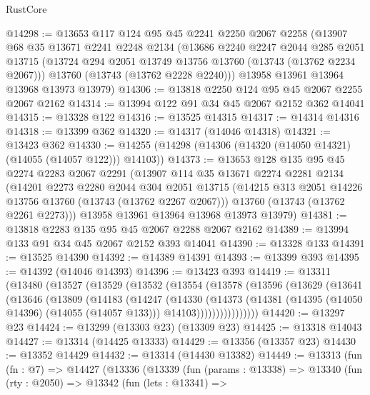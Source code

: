 \begin{lexlean}{RustCore}
\begin{coremodule}
@14298 := @13653
    @117
    @124
    @95
    @45
    @2241
    @2250
    @2067
    @2258
    (@13907
      @68
      @35
      @13671
      @2241
      @2248
      @2134
      (@13686
        @2240
        @2247
        @2044
        @285
        @2051
        @13715
        (@13724 @294 @2051 @13749 @13756 @13760 (@13743 (@13762 @2234 @2067)))
        @13760
        (@13743 (@13762 @2228 @2240)))
      @13958
      @13961
      @13964
      @13968
      @13973
      @13979)
@14306 := @13818 @2250 @124 @95 @45 @2067 @2255 @2067 @2162
@14314 := @13994 @122 @91 @34 @45 @2067 @2152 @362 @14041
@14315 := @13328 @122
@14316 := @13525 @14315
@14317 := @14314 @14316
@14318 := @13399 @362
@14320 := @14317 (@14046 @14318)
@14321 := @13423 @362
@14330 := @14255 (@14298 (@14306 (@14320 (@14050 @14321) (@14055 (@14057 @122))) @14103))
@14373 := @13653
    @128
    @135
    @95
    @45
    @2274
    @2283
    @2067
    @2291
    (@13907
      @114
      @35
      @13671
      @2274
      @2281
      @2134
      (@14201
        @2273
        @2280
        @2044
        @304
        @2051
        @13715
        (@14215 @313 @2051 @14226 @13756 @13760 (@13743 (@13762 @2267 @2067)))
        @13760
        (@13743 (@13762 @2261 @2273)))
      @13958
      @13961
      @13964
      @13968
      @13973
      @13979)
@14381 := @13818 @2283 @135 @95 @45 @2067 @2288 @2067 @2162
@14389 := @13994 @133 @91 @34 @45 @2067 @2152 @393 @14041
@14390 := @13328 @133
@14391 := @13525 @14390
@14392 := @14389 @14391
@14393 := @13399 @393
@14395 := @14392 (@14046 @14393)
@14396 := @13423 @393
@14419 := @13311
    (@13480
      (@13527
        (@13529
          (@13532
            (@13554
              (@13578
                (@13596
                  (@13629
                    (@13641
                      (@13646
                        (@13809
                          (@14183
                            (@14247
                              (@14330
                                (@14373
                                  (@14381
                                    (@14395 (@14050 @14396) (@14055 (@14057 @133)))
                                    @14103))))))))))))))))
@14420 := @13297 @23
@14424 := @13299 (@13303 @23) (@13309 @23)
@14425 := @13318 @14043
@14427 := @13314 (@14425 @13333)
@14429 := @13356 (@13357 @23)
@14430 := @13352 @14429
@14432 := @13314 (@14430 @13382)
@14449 := @13313
    (fun (fn : @7) =>
    @14427
      (@13336
        (@13339
          (fun (params : @13338) =>
          @13340
            (fun (rty : @2050) =>
            @13342
              (fun (lets : @13341) =>

\end{coremodule}
\end{lexlean}

